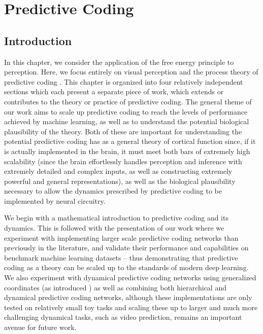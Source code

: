 \chapter{Predictive Coding}

\section{Introduction}

In this chapter, we consider the application of the free energy principle to perception. Here, we focus entirely on visual perception and the process theory of predictive coding \citep{friston2003learning,friston2005theory,bastos2012canonical,buckley2017free,spratling2017review}. This chapter is organized into four relatively independent sections which each present a separate piece of work, which extends or contributes to the theory or practice of predictive coding. The general theme of our work aims to scale up predictive coding to reach the levels of performance achieved by machine learning, as well as to understand the potential biological plausibility of the theory. Both of these are important for understanding the potential predictive coding has as a general theory of cortical function since, if it is actually implemented in the brain, it must meet both bars of extremely high scalability (since the brain effortlessly handles perception and inference with extremely detailed and complex inputs, as well as constructing extremely powerful and general representations), as well as the biological plausibility necessary to allow the dynamics prescribed by predictive coding to be implemented by neural circuitry.

We begin with a mathematical introduction to predictive coding and its dynamics. This is followed with the presentation of our work where we experiment with implementing larger scale predictive coding networks than previously in the literature, and validate their performance and capabilities on benchmark machine learning datasets -- thus demonstrating that predictive coding as a theory can be scaled up to the standards of modern deep learning. We also experiment with dynamical predictive coding networks using generalized coordinates (as introduced \citep{friston2008DEM}) as well as combining both hierarchical and dynamical predictive coding networks, although these implementations are only tested on relatively small toy tasks and scaling these up to larger and much more challenging dynamical tasks, such as video prediction, remains an important avenue for future work.

